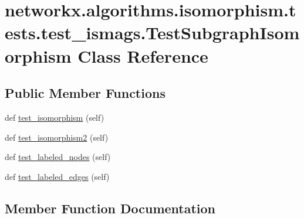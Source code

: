 \hypertarget{classnetworkx_1_1algorithms_1_1isomorphism_1_1tests_1_1test__ismags_1_1TestSubgraphIsomorphism}{}\section{networkx.\+algorithms.\+isomorphism.\+tests.\+test\+\_\+ismags.\+Test\+Subgraph\+Isomorphism Class Reference}
\label{classnetworkx_1_1algorithms_1_1isomorphism_1_1tests_1_1test__ismags_1_1TestSubgraphIsomorphism}
\subsection*{Public Member Functions}
\begin{DoxyCompactItemize}
\item 
def \hyperlink{classnetworkx_1_1algorithms_1_1isomorphism_1_1tests_1_1test__ismags_1_1TestSubgraphIsomorphism_af8ffa3e4f2cbc55db76c01b5f78df059}{test\+\_\+isomorphism} (self)
\item 
def \hyperlink{classnetworkx_1_1algorithms_1_1isomorphism_1_1tests_1_1test__ismags_1_1TestSubgraphIsomorphism_ac293966fc8bc4e3ba5d70482462240e0}{test\+\_\+isomorphism2} (self)
\item 
def \hyperlink{classnetworkx_1_1algorithms_1_1isomorphism_1_1tests_1_1test__ismags_1_1TestSubgraphIsomorphism_a8d5533754fb0f9aace090d4d4dcb0b22}{test\+\_\+labeled\+\_\+nodes} (self)
\item 
def \hyperlink{classnetworkx_1_1algorithms_1_1isomorphism_1_1tests_1_1test__ismags_1_1TestSubgraphIsomorphism_ac586e8800925d1cb022cd063faa9fce3}{test\+\_\+labeled\+\_\+edges} (self)
\end{DoxyCompactItemize}


\subsection{Member Function Documentation}
\mbox{\label{classnetworkx_1_1algorithms_1_1isomorphism_1_1tests_1_1test__ismags_1_1TestSubgraphIsomorphism_af8ffa3e4f2cbc55db76c01b5f78df059}} 
